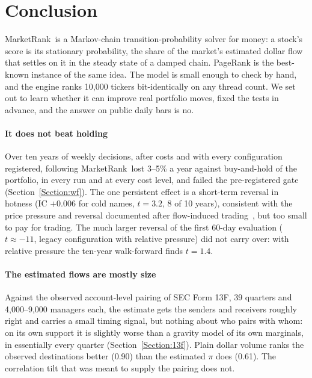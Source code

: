 \documentclass[preprint,3p,twocolumn]{elsarticle}
\newcommand{\MR}{MarketRank}
\begin{document}
\section{Conclusion}
\label{Section:conclusion}

\MR\ is a Markov-chain transition-probability solver for money: a stock's score is its stationary probability, the share of the market's estimated dollar flow that settles on it in the steady state of a damped chain. PageRank is the best-known instance of the same idea. The model is small enough to check by hand, and the engine ranks 10,000 tickers bit-identically on any thread count. We set out to learn whether it can improve real portfolio moves, fixed the tests in advance, and the answer on public daily bars is no.

\paragraph{It does not beat holding} Over ten years of weekly decisions, after costs and with every configuration registered, following \MR\ lost 3--5\% a year against buy-and-hold of the portfolio, in every run and at every cost level, and failed the pre-registered gate (Section~\ref{Section:wf}). The one persistent effect is a short-term reversal in hotness (IC $+0.006$ for cold names, $t=3.2$, 8 of 10 years), consistent with the price pressure and reversal documented after flow-induced trading~\cite{covalstafford}, but too small to pay for trading. The much larger reversal of the first 60-day evaluation ($t\approx-11$, legacy configuration with relative pressure) did not carry over: with relative pressure the ten-year walk-forward finds $t=1.4$.

\paragraph{The estimated flows are mostly size} Against the observed account-level pairing of SEC Form 13F, 39 quarters and 4,000--9,000 managers each, the estimate gets the senders and receivers roughly right and carries a small timing signal, but nothing about who pairs with whom: on its own support it is slightly worse than a gravity model of its own marginals, in essentially every quarter (Section~\ref{Section:13f}). Plain dollar volume ranks the observed destinations better (0.90) than the estimated $\pi$ does (0.61). The correlation tilt that was meant to supply the pairing does not.
\end{document}

